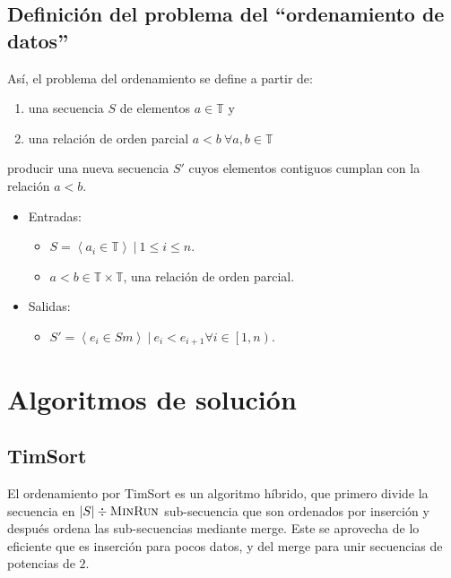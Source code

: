 \documentclass[letter]{article}
\begin{document}
\subsection{Definición del problema del ``ordenamiento de datos''} \label{problema}
Así, el problema del ordenamiento se define a partir de:
  \begin{enumerate}
    \item una secuencia $S$ de elementos $a\in \mathbb{T}$ y
    \item una relación de orden parcial $a<b~\forall a,b\in \mathbb{T}$
  \end{enumerate}
producir una nueva secuencia $S'$ cuyos elementos contiguos cumplan con la relación $a<b$.
\begin{itemize}
    \item Entradas:
    \begin{itemize}
        \item $S = \left< a_i \in \mathbb{T} \right> ~ | ~ 1\le i \le n$.
        \item $a<b \in \mathbb{T} \times \mathbb{T}$, una relación de orden parcial.
    \end{itemize}
    \item Salidas:
    \begin{itemize}
        \item $S' = \left< e_i \in S m\right> ~ | ~ e_i < e_{i+1} \forall i \in \left[1,n\right)$.
    \end{itemize}
\end{itemize}

\section{Algoritmos de solución} \label{algoritmos}

\subsection{TimSort} \label{algoritmos:timsort}

El ordenamiento por TimSort es un algoritmo híbrido, que primero divide la secuencia en $|S| \div \textsc{MinRun}$ sub-secuencia que son ordenados por inserción y después ordena las sub-secuencias mediante merge. Este se aprovecha de lo eficiente que es inserción para pocos datos, y del merge para unir secuencias de potencias de $2$. \par

\newpage
\end{document}
